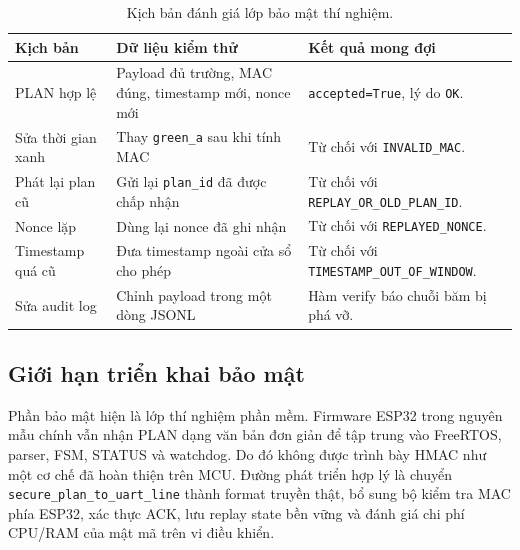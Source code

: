 \begin{table}[H]
\centering
\caption{Kịch bản đánh giá lớp bảo mật thí nghiệm.}
\label{tab:security-tests}
\footnotesize
\setlength{\tabcolsep}{4pt}
\renewcommand{\arraystretch}{1.18}
\begin{tabularx}{\linewidth}{R{3.1cm}R{4.0cm}Y}
\toprule
\textbf{Kịch bản} & \textbf{Dữ liệu kiểm thử} & \textbf{Kết quả mong đợi} \\
\midrule
PLAN hợp lệ & Payload đủ trường, MAC đúng, timestamp mới, nonce mới & \texttt{accepted=True}, lý do \texttt{OK}. \\
Sửa thời gian xanh & Thay \texttt{green\_a} sau khi tính MAC & Từ chối với \texttt{INVALID\_MAC}. \\
Phát lại plan cũ & Gửi lại \texttt{plan\_id} đã được chấp nhận & Từ chối với \texttt{REPLAY\_OR\_OLD\_PLAN\_ID}. \\
Nonce lặp & Dùng lại nonce đã ghi nhận & Từ chối với \texttt{REPLAYED\_NONCE}. \\
Timestamp quá cũ & Đưa timestamp ngoài cửa sổ cho phép & Từ chối với \texttt{TIMESTAMP\_OUT\_OF\_WINDOW}. \\
Sửa audit log & Chỉnh payload trong một dòng JSONL & Hàm verify báo chuỗi băm bị phá vỡ. \\
\bottomrule
\end{tabularx}
\normalsize
\end{table}

\subsection{Giới hạn triển khai bảo mật}

Phần bảo mật hiện là lớp thí nghiệm phần mềm. Firmware ESP32 trong nguyên mẫu chính vẫn nhận PLAN dạng văn bản đơn giản để tập trung vào FreeRTOS, parser, FSM, STATUS và watchdog. Do đó không được trình bày HMAC như một cơ chế đã hoàn thiện trên MCU. Đường phát triển hợp lý là chuyển \texttt{secure\_plan\_to\_uart\_line} thành format truyền thật, bổ sung bộ kiểm tra MAC phía ESP32, xác thực ACK, lưu replay state bền vững và đánh giá chi phí CPU/RAM của mật mã trên vi điều khiển.
